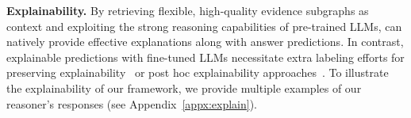 \textbf{Explainability.} By retrieving flexible, high-quality evidence subgraphs as context and exploiting the strong reasoning capabilities of pre-trained LLMs, \proj can natively provide effective explanations along with answer predictions. In contrast, explainable predictions with fine-tuned LLMs necessitate extra labeling efforts for preserving explainability~\citep{luo2024rog} or post hoc explainability approaches~\citep{krishna2023post}. To illustrate the explainability of our framework, we provide multiple examples of our reasoner's responses (see Appendix~\ref{appx:explain}).
